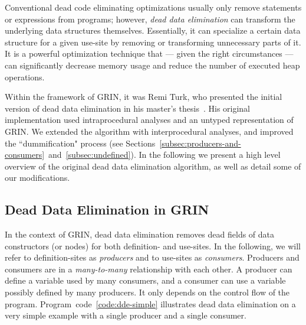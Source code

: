 \documentclass[main.tex]{subfiles}
\begin{document}
	
	
	Conventional dead code eliminating optimizations usually only remove statements or expressions from programs; however, \emph{dead data elimination} can transform the underlying data structures themselves. Essentially, it can specialize a certain data structure for a given use-site by removing or transforming unnecessary parts of it. It is a powerful optimization technique that --- given the right circumstances --- can significantly decrease memory usage and reduce the number of executed heap operations.
	
	Within the framework of GRIN, it was Remi Turk, who presented the initial version of dead data elimination in his master's thesis~\cite{remi-masters}. His original implementation used intraprocedural analyses and an untyped representation of GRIN. We extended the algorithm with interprocedural analyses, and improved the ``dummification" process (see Sections~\ref{subsec:producers-and-consumers}~and~\ref{subsec:undefined}). In the following we present a high level overview of the original dead data elimination algorithm, as well as detail some of our modifications.
	
	\subsection{Dead Data Elimination in GRIN}
	
	In the context of GRIN, dead data elimination removes dead fields of data constructors (or nodes) for both definition- and use-sites. In the following, we will refer to definition-sites as \emph{producers} and to use-sites as \emph{consumers}. Producers and consumers are in a \emph{many-to-many} relationship with each other. A producer can define a variable used by many consumers, and a consumer can use a variable possibly defined by many producers. It only depends on the control flow of the program. Program~code~\ref{code:dde-simple} illustrates dead data elimination on a very simple example with a single producer and a single consumer.
	
\end{document}
